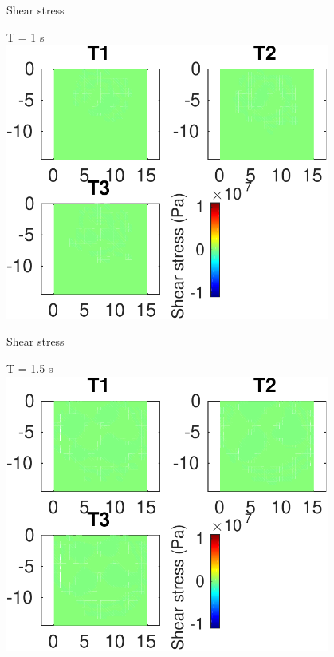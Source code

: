 \documentclass{beamer}
\begin{document}
\begin{frame}
 {Shear stress}
 
 \centering \Large T = 1 s\\
 \includegraphics[width=0.8\textwidth]{images/vertical_00016}
 
\end{frame}

\begin{frame}
 {Shear stress}
 
 \centering \Large T = 1.5 s\\
 \includegraphics[width=0.8\textwidth]{images/vertical_00021}
 
\end{frame}
\end{document}
